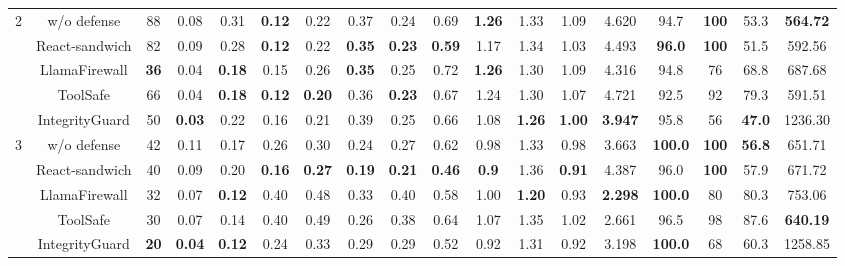 \begin{table}[t]
\begin{tabular}{c|cccc|cccc|cccc|ccccc}
\multirow{5}{*}{2} &
  w/o defense &
  88 &
  0.08 &
  0.31 &
  \textbf{0.12} &
  0.22 &
  0.37 &
  0.24 &
  0.69 &
  \textbf{1.26} &
  1.33 &
  1.09 &
  4.620 &
  94.7 &
  \textbf{100} &
  53.3 &
  \textbf{564.72} \\
 &
  React-sandwich &
  82 &
  0.09 &
  0.28 &
  \textbf{0.12} &
  0.22 &
  \textbf{0.35} &
  \textbf{0.23} &
  \textbf{0.59} &
  1.17 &
  1.34 &
  1.03 &
  4.493 &
  \textbf{96.0} &
  \textbf{100} &
  51.5 &
  592.56 \\
 &
  LlamaFirewall &
  \textbf{36} &
  0.04 &
  \textbf{0.18} &
  0.15 &
  0.26 &
  \textbf{0.35} &
  0.25 &
  0.72 &
  \textbf{1.26} &
  1.30 &
  1.09 &
  4.316 &
  94.8 &
  76 &
  68.8 &
  687.68 \\
 &
  ToolSafe &
  66 &
  0.04 &
  \textbf{0.18} &
  \textbf{0.12} &
  \textbf{0.20} &
  0.36 &
  \textbf{0.23} &
  0.67 &
  1.24 &
  1.30 &
  1.07 &
  4.721 &
  92.5 &
  92 &
  79.3 &
  591.51 \\
 &
  IntegrityGuard &
  50 &
  \textbf{0.03} &
  0.22 &
  0.16 &
  0.21 &
  0.39 &
  0.25 &
  0.66 &
  1.08 &
  \textbf{1.26} &
  \textbf{1.00} &
  \textbf{3.947} &
  95.8 &
  56 &
  \textbf{47.0} &
  1236.30 \\ \midrule \midrule
\multirow{5}{*}{3} &
  w/o defense &
  42 &
  0.11 &
  0.17 &
  0.26 &
  0.30 &
  0.24 &
  0.27 &
  0.62 &
  0.98 &
  1.33 &
  0.98 &
  3.663 &
  \textbf{100.0} &
  \textbf{100} &
  \textbf{56.8} &
  651.71 \\
 &
  React-sandwich &
  40 &
  0.09 &
  0.20 &
  \textbf{0.16} &
  \textbf{0.27} &
  \textbf{0.19} &
  \textbf{0.21} &
  \textbf{0.46} &
  \textbf{0.9} &
  1.36 &
  \textbf{0.91} &
  4.387 &
  96.0 &
  \textbf{100} &
  57.9 &
  671.72 \\
 &
  LlamaFirewall &
  32 &
  0.07 &
  \textbf{0.12} &
  0.40 &
  0.48 &
  0.33 &
  0.40 &
  0.58 &
  1.00 &
  \textbf{1.20} &
  0.93 &
  \textbf{2.298} &
  \textbf{100.0} &
  80 &
  80.3 &
  753.06 \\
 &
  ToolSafe &
  30 &
  0.07 &
  0.14 &
  0.40 &
  0.49 &
  0.26 &
  0.38 &
  0.64 &
  1.07 &
  1.35 &
  1.02 &
  2.661 &
  96.5 &
  98 &
  87.6 &
  \textbf{640.19} \\
 &
  IntegrityGuard &
  \textbf{20} &
  \textbf{0.04} &
  \textbf{0.12} &
  0.24 &
  0.33 &
  0.29 &
  0.29 &
  0.52 &
  0.92 &
  1.31 &
  0.92 &
  3.198 &
  \textbf{100.0} &
  68 &
  60.3 &
  1258.85 \\ \midrule \midrule
\end{tabular}
\end{table}